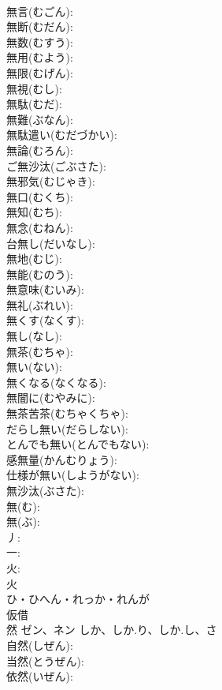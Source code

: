 \documentclass[8pt]{extreport}
\begin{document}
\begin{CJK}{UTF8}{min}
\\	無言(むごん): 
\\	無断(むだん): 
\\	無数(むすう): 
\\	無用(むよう): 
\\	無限(むげん): 
\\	無視(むし): 
\\	無駄(むだ): 
\\	無難(ぶなん): 
\\	無駄遣い(むだづかい): 
\\	無論(むろん): 
\\	ご無沙汰(ごぶさた): 
\\	無邪気(むじゃき): 
\\	無口(むくち): 
\\	無知(むち): 
\\	無念(むねん): 
\\	台無し(だいなし): 
\\	無地(むじ): 
\\	無能(むのう): 
\\	無意味(むいみ): 
\\	無礼(ぶれい): 
\\	無くす(なくす): 
\\	無し(なし): 
\\	無茶(むちゃ): 
\\	無い(ない): 
\\	無くなる(なくなる): 
\\	無闇に(むやみに): 
\\	無茶苦茶(むちゃくちゃ): 
\\	だらし無い(だらしない): 
\\	とんでも無い(とんでもない): 
\\	感無量(かんむりょう): 
\\	仕様が無い(しようがない): 
\\	無沙汰(ぶさた): 
\\	無(む): 
\\	無(ぶ): 
\\	丿: 
\\	一: 
\\	火: 
\\	火	
\\	ひ・ひへん・れっか・れんが	
\\	仮借 
\\	然	ゼン、ネン	しか、しか.り、しか.し、さ		
\\	自然(しぜん): 
\\	当然(とうぜん): 
\\	依然(いぜん): 

\end{CJK}
\end{document}
